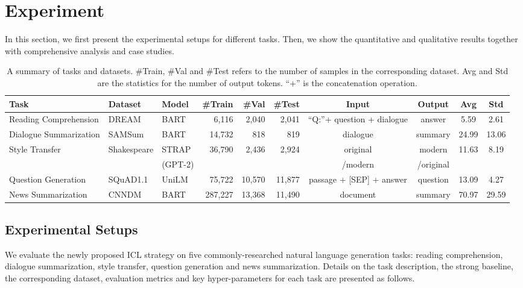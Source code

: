 \section{Experiment}
\label{sec:experiment}
In this section,
we first present the experimental setups for different tasks. Then, we show the quantitative and qualitative results together with comprehensive analysis and case studies.

\begin{table*}[th]
	\scriptsize
	\centering
	\begin{tabular}{lp{1.1cm}p{0.9cm}rrrcccc}
		\hline
		Task & Dataset & Model & \#Train & \#Val & \#Test & Input & Output & Avg & Std\\
		\hline
		Reading Comprehension & DREAM &BART& 6,116 & 2,040 & 2,041 & ``Q:''+ question + dialogue & answer & 5.59 & 2.61\\
		Dialogue Summarization & SAMSum &BART& 14,732 & 818 & 819 & dialogue & summary  & 24.99 & 13.06\\
		\multirow{2}{*}{Style Transfer} & \multirow{2}{*}{Shakespeare} &{STRAP}&  \multirow{2}{*}{36,790} &  \multirow{2}{*}{2,436} &  \multirow{2}{*}{2,924} & {original}  & {modern}  &  \multirow{2}{*}{11.63} & \multirow{2}{*}{8.19} \\
		&&(GPT-2) &  & && /modern& /original & & \\
		Question Generation & SQuAD1.1 &UniLM& 75,722 & 10,570 & 11,877 & passage + [SEP] + answer & question & 13.09 & 4.27 \\
		News Summarization & CNNDM &BART& 287,227& 13,368& 11,490 & document & summary & 70.97 & 29.59\\ 
		\hline
	\end{tabular}
	\caption{A summary of tasks and datasets. \#Train, \#Val and \#Test refers to the number of samples in the corresponding dataset. Avg and Std are the statistics for the number of output tokens. ``+'' is the concatenation operation.}
	\label{tab:taskdata}
\end{table*}
\subsection{Experimental Setups}
\label{sec:implementation}
We evaluate the newly proposed ICL strategy on five commonly-researched natural language generation tasks: reading comprehension, dialogue summarization, style transfer, question generation and news summarization. Details on the task description, the strong baseline, the corresponding dataset, evaluation metrics and key hyper-parameters for each task are presented as follows.%



